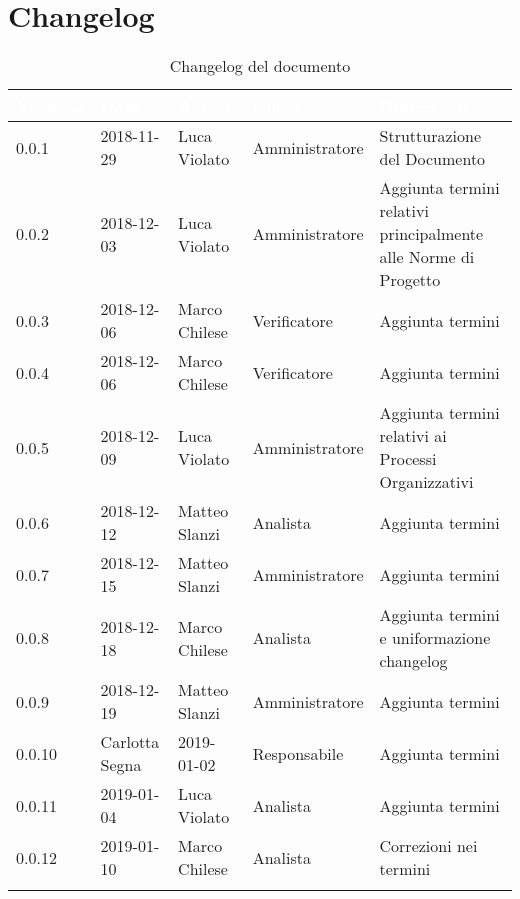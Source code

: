 \section*{Changelog}

\begin{center}
\begin{longtable}[c]{|m{}|m{}|m{}|m{}|p{}|}
\hline
\rowcolor{bluelogo}\textbf{\textcolor{white}{Versione}} & \textbf{\textcolor{white}{Data}} & \textbf{\textcolor{white}{Autore}} & \textbf{\textcolor{white}{Ruolo}} & \textbf{\textcolor{white}{Descrizione}} \\
\hline \hline
\endfirsthead
0.0.1 & 2018-11-29 & Luca Violato & Amministratore & Strutturazione del Documento \\
\hline
\rowcolor{grigio}0.0.2 & 2018-12-03 & Luca Violato & Amministratore & Aggiunta termini relativi principalmente alle Norme di Progetto \\
\hline
0.0.3 & 2018-12-06 & Marco Chilese & Verificatore & Aggiunta termini\\
\hline 
\rowcolor{grigio}0.0.4 & 2018-12-06 & Marco Chilese & Verificatore & Aggiunta termini\\
\hline
0.0.5 & 2018-12-09 & Luca Violato & Amministratore & Aggiunta termini relativi ai Processi Organizzativi\\
\hline
\rowcolor{grigio}0.0.6 & 2018-12-12 & Matteo Slanzi & Analista & Aggiunta termini\\
\hline
0.0.7 & 2018-12-15 & Matteo Slanzi & Amministratore & Aggiunta termini\\
\hline
\rowcolor{grigio}0.0.8 & 2018-12-18 & Marco Chilese & Analista & Aggiunta termini e uniformazione changelog\\
\hline
0.0.9 & 2018-12-19 & Matteo Slanzi & Amministratore & Aggiunta termini\\
\hline
\rowcolor{grigio} 0.0.10 & Carlotta Segna & 2019-01-02 & Responsabile & Aggiunta termini\\
\hline
0.0.11 & 2019-01-04 & Luca Violato & Analista & Aggiunta termini\\
\hline
\rowcolor{grigio}0.0.12 & 2019-01-10 & Marco Chilese & Analista & Correzioni nei termini\\
\hline
\caption{Changelog del documento}
\end{longtable}
\end{center}